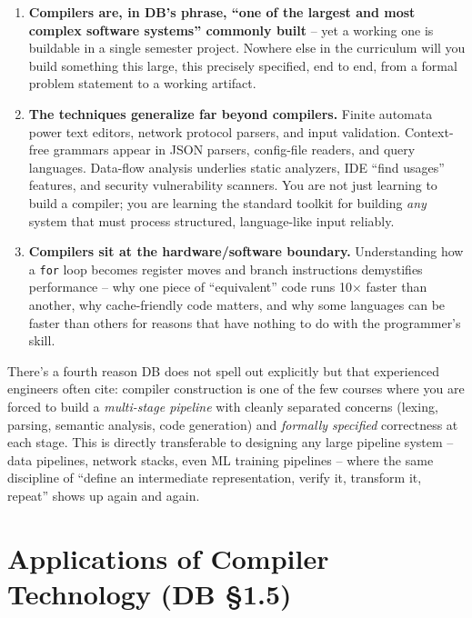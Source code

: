 \documentclass[11pt]{article}
\begin{document}
\begin{enumerate}
  \item \textbf{Compilers are, in DB's phrase, ``one of the largest and most complex software
  systems'' commonly built} -- yet a working one is buildable in a single semester project.
  Nowhere else in the curriculum will you build something this large, this precisely specified,
  end to end, from a formal problem statement to a working artifact.
  \item \textbf{The techniques generalize far beyond compilers.} Finite automata power text
  editors, network protocol parsers, and input validation. Context-free grammars appear in JSON
  parsers, config-file readers, and query languages. Data-flow analysis underlies static
  analyzers, IDE ``find usages'' features, and security vulnerability scanners. You are not just
  learning to build a compiler; you are learning the standard toolkit for building \emph{any}
  system that must process structured, language-like input reliably.
  \item \textbf{Compilers sit at the hardware/software boundary.} Understanding how a
  \texttt{for} loop becomes register moves and branch instructions demystifies performance --
  why one piece of ``equivalent'' code runs 10$\times$ faster than another, why cache-friendly
  code matters, and why some languages can be faster than others for reasons that have nothing to
  do with the programmer's skill.
\end{enumerate}

\begin{enrichment}
There's a fourth reason DB does not spell out explicitly but that experienced engineers often
cite: compiler construction is one of the few courses where you are forced to build a
\emph{multi-stage pipeline} with cleanly separated concerns (lexing, parsing, semantic
analysis, code generation) and \emph{formally specified} correctness at each stage. This is
directly transferable to designing any large pipeline system -- data pipelines, network stacks,
even ML training pipelines -- where the same discipline of ``define an intermediate
representation, verify it, transform it, repeat'' shows up again and again.
\end{enrichment}

\section{Applications of Compiler Technology (DB \S1.5)}
\end{document}
